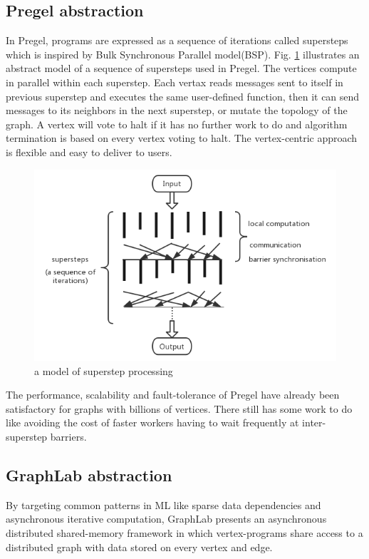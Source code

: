 \documentclass[journal]{IEEEtran}
\begin{document}
\subsection{Pregel abstraction}
In Pregel\cite{Pregel}, programs are expressed as a sequence of iterations called supersteps which is inspired by Bulk Synchronous Parallel model(BSP). Fig. \ref{pregel} illustrates an abstract model of a sequence of supersteps used in Pregel. The vertices compute in parallel within each superstep. Each vertax reads messages sent to itself in previous superstep and executes the same user-defined function, then it can send messages to its neighbors in the next superstep, or mutate the topology of the graph. A vertex will vote to halt if it has no further work to do and algorithm termination is based on every vertex voting to halt. The vertex-centric approach is flexible and easy to deliver to users.
\begin{figure}
	\includegraphics[width=\linewidth]{pregel.jpg}
	\caption{a model of superstep processing}
	\label{pregel}
\end{figure}

The performance, scalability and fault-tolerance of Pregel have already been satisfactory for graphs with billions of vertices\cite{Pregel}. There still has some work to do like avoiding the cost of faster workers having to wait frequently at inter-superstep barriers.
\subsection{GraphLab abstraction}
By targeting common patterns in ML like sparse data dependencies and asynchronous iterative computation, GraphLab presents an asynchronous distributed shared-memory framework in which vertex-programs share access to a distributed graph with data stored on every vertex and edge.
\end{document}
